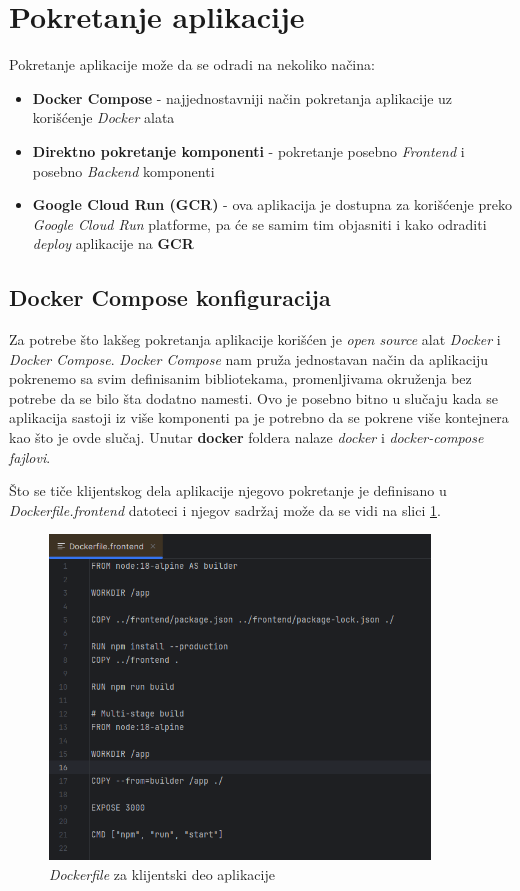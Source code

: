 \documentclass[12pt,oneside]{memoir}
\begin{document}
\section{Pokretanje aplikacije}

Pokretanje aplikacije može da se odradi na nekoliko načina:
\begin{itemize}
    \item \textbf{Docker Compose} \cite{docker_compose} - najjednostavniji način pokretanja aplikacije uz korišćenje \emph{Docker} alata \cite{docker}
    \item \textbf{Direktno pokretanje komponenti} - pokretanje posebno \emph{Frontend} i posebno \emph{Backend} komponenti
    \item \textbf{Google Cloud Run (GCR)} \cite{gcr} - ova aplikacija je dostupna za korišćenje preko \emph{Google Cloud Run} platforme, pa će se samim tim objasniti i kako odraditi \emph{deploy} aplikacije na \textbf{GCR}
\end{itemize}

\subsection{Docker Compose konfiguracija}
Za potrebe što lakšeg pokretanja aplikacije korišćen je \emph{open source} alat \emph{Docker} i \emph{Docker Compose}. \emph{Docker Compose} nam pruža jednostavan način da aplikaciju pokrenemo sa svim definisanim bibliotekama, promenljivama okruženja bez potrebe da se bilo šta dodatno namesti. Ovo je posebno bitno u slučaju kada se aplikacija sastoji iz više komponenti pa je potrebno da se pokrene više kontejnera kao što je ovde slučaj.
Unutar \textbf{docker} foldera nalaze \emph{docker} i \emph{docker-compose fajlovi}.

Što se tiče klijentskog dela aplikacije njegovo pokretanje je definisano u \emph{Dockerfile.frontend} datoteci i njegov sadržaj može da se vidi na slici \ref{fig:docker_frontend}.

\begin{figure}[h]
\centering
\includegraphics[width=0.9\textwidth]{images/docker_frontend.png}
\caption{\emph{Dockerfile} za klijentski deo aplikacije}
\label{fig:docker_frontend}
\end{figure}
\end{document}
